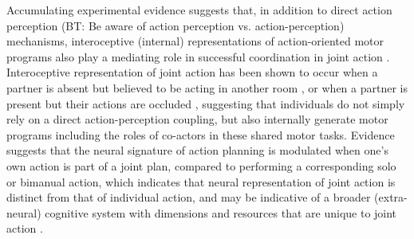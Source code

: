 \begin{CJK}{UTF8}{gbsn}

Accumulating experimental evidence suggests that, in addition to direct action perception (BT: Be aware of action perception vs. action-perception) mechanisms, interoceptive (internal) representations of action-oriented motor programs also play a mediating role in successful coordination in joint action \citep{Moreau2016}.  Interoceptive representation of joint action has been shown to occur when a partner is absent but believed to be acting in another room \citep{Milward2014}, or when a partner is present but their actions are occluded \citep{Atmaca2011}, suggesting that individuals do not simply rely on a direct action-perception coupling, but also internally generate motor programs including the roles of co-actors in these shared motor tasks.
Evidence suggests that the neural signature of action planning is modulated when one's own action is part of a joint plan, compared to performing a corresponding solo or bimanual action, which indicates that neural representation of joint action is distinct from that of individual action, and may be indicative of a broader (extra-neural) cognitive system with dimensions and resources that are unique to joint action \citep{Kourtis2014}.



\end{CJK}
